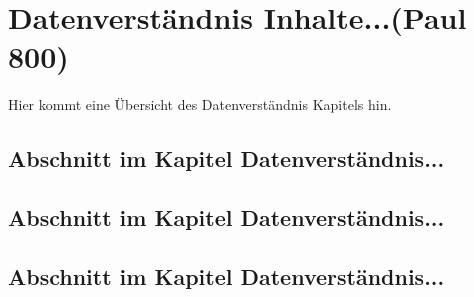 \chapter{Datenverständnis Inhalte...(Paul 800)}
\label{sec:Kapitel3}

Hier kommt eine Übersicht des Datenverständnis Kapitels hin.

\section{Abschnitt im Kapitel Datenverständnis...}
\label{sec:abschnitt3.1}

\section{Abschnitt im Kapitel Datenverständnis...}

\section{Abschnitt im Kapitel Datenverständnis...}